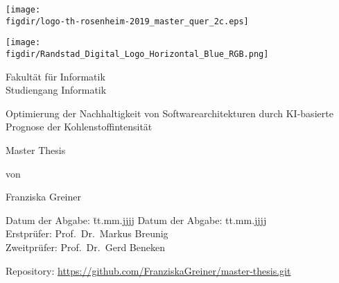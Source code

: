 \begin{titlepage}

\sffamily

\begin{flushright}

\vspace*{-2cm}

\texttt{[image: \\figdir/logo-th-rosenheim-2019\_master\_quer\_2c.eps]}

\end{flushright}
\begin{flushleft}

\vspace*{-2cm}

\texttt{[image: \\figdir/Randstad\_Digital\_Logo\_Horizontal\_Blue\_RGB.png]}
\end{flushleft}

\vfill

\centering
\LARGE
Fakultät für Informatik  \vspace{0.5cm}\\
\Large
Studiengang Informatik

\vspace{2cm}

\LARGE

Optimierung der Nachhaltigkeit von Softwarearchitekturen durch KI-basierte Prognose der Kohlenstoffintensität

\vspace{2cm}

\Large
Master Thesis

\vspace{1.5cm}


\Large
von

\vspace{0.5cm}


\LARGE
Franziska Greiner \vspace{1cm}

\vspace{1cm}

\flushleft
 \Large
\vspace*{\fill}

\begin{tabbing}
Datum der Abgabe: \= tt.mm.jjjj \kill
Datum der Abgabe: \> tt.mm.jjjj \\
Erstprüfer: \> Prof.\ Dr.\ Markus Breunig\\
Zweitprüfer: \> Prof.\ Dr.\ Gerd Beneken
\end{tabbing}

\vspace{1cm}
\centering
\small
Repository:
\url{https://github.com/FranziskaGreiner/master-thesis.git}

\end{titlepage}

